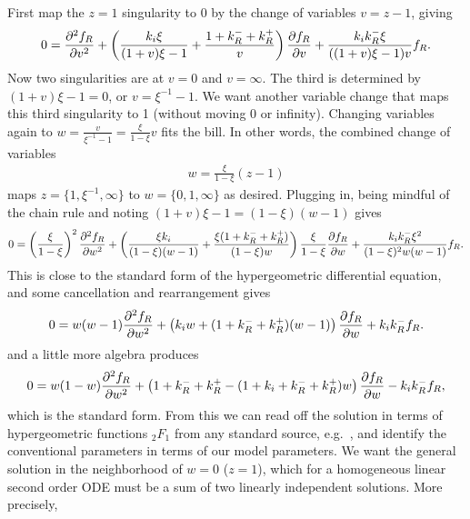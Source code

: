 First map the $z=1$ singularity to 0 by the change of variables $v=z-1$, giving
\begin{align}
0 = \psecderiv[f_R]{v}
        + \left(\frac{k_i\xi}{(1+v)\xi - 1}
                + \frac{1 + k_R^- + k_R^+}{v}
        \right)\pderiv[f_R]{v}
        + \frac{k_i k_R^- \xi}{((1+v)\xi - 1)v}f_R.
\end{align}
Now two singularities are at $v=0$ and $v=\infty$. The third is determined by
$(1+v)\xi -1 = 0$, or $v=\xi^{-1} - 1$. We want another variable change that
maps this third singularity to 1 (without moving 0 or infinity). Changing
variables again to $w=\frac{v}{\xi^{-1} - 1} = \frac{\xi}{1-\xi} v$ fits the
bill. In other words, the combined change of variables
\begin{align}
w = \frac{\xi}{1-\xi} (z-1)
\end{align}
maps $z = \{1, \xi^{-1}, \infty\}$ to $w =\{0, 1, \infty\}$ as desired. Plugging
in, being mindful of the chain rule and noting
$(1 + v)\xi - 1 = (1 - \xi)(w - 1)$ gives
\begin{align}
0 = \left(\frac{\xi}{1-\xi}\right)^2 \psecderiv[f_R]{w}
+ \left(
        \frac{\xi k_i}{(1-\xi)(w-1)} + \frac{\xi(1 + k_R^- + k_R^+)}{(1-\xi)w}
\right) \frac{\xi}{1-\xi} \pderiv[f_R]{w}
+ \frac{k_i k_R^- \xi^2}{(1-\xi)^2 w(w-1)}f_R.
\end{align}
This is close to the standard form of the hypergeometric differential equation,
and some cancellation and rearrangement gives
\begin{align}
0 = w(w-1)\psecderiv[f_R]{w}
+ \left(k_i w + (1 + k_R^- + k_R^+)(w-1)\right) \pderiv[f_R]{w}
+ k_i k_R^- f_R.
\end{align}
and a little more algebra produces
\begin{align}
0 = w(1-w)\psecderiv[f_R]{w}
+ \left(1 + k_R^- + k_R^+
        - (1 + k_i + k_R^- + k_R^+)w
\right) \pderiv[f_R]{w}
- k_i k_R^- f_R,
\end{align}
which is the standard form. From this we can read off the solution in terms of
hypergeometric functions ${_2F_1}$ from any standard source,
e.g.~\cite{Abramowitz1964}, and identify the conventional parameters in terms of
our model parameters. We want the general solution in the neighborhood of $w=0$
($z=1$), which for a homogeneous linear second order ODE must be a sum of two
linearly independent solutions. More precisely, 
